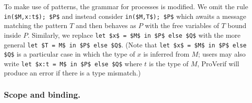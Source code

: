 \documentclass{book}
\begin{document}
To make use of patterns, the grammar for processes is modified. We omit the rule \lstinline!in($M,x:t$); $P$! and instead consider \lstinline!in($M,T$); $P$! which awaits a message matching the pattern $T$ and then behaves as $P$ with the free variables of $T$ bound inside $P$. Similarly, we replace \lstinline!let $x$ = $M$ in $P$ else $Q$! with the more general \lstinline!let $T = M$ in $P$ else $Q$!. (Note that \lstinline!let $x$ = $M$ in $P$ else $Q$! is a particular case in which the type of $x$ is inferred from $M$; users may also write \lstinline!let $x:t = M$ in $P$ else $Q$! where $t$ is the type of $M$, ProVerif will produce an error if there is a type mismatch.)

\subsubsection{Scope and binding.}
\end{document}
